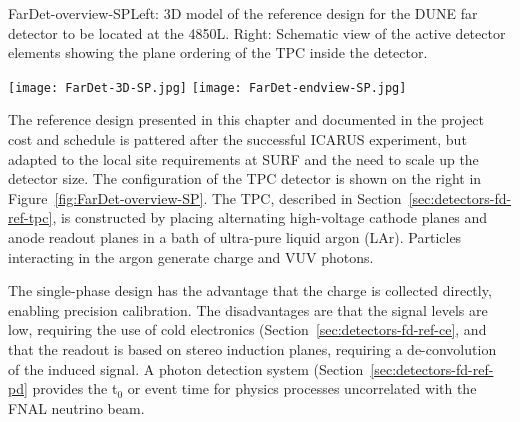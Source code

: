 \begin{cdrfigure}{FarDet-overview-SP}{Left: 3D model of the reference design for the DUNE far detector to be located at the 4850L. Right: Schematic view of the active detector elements showing the plane ordering of the TPC inside the detector.}
\centering
\begin{minipage}[b]{1.0\textwidth}
\begin{center}
\texttt{[image: FarDet-3D-SP.jpg]}
\texttt{[image: FarDet-endview-SP.jpg]}
\end{center}
\end{minipage}
\end{cdrfigure}

The reference design presented in this chapter and documented in the project cost and schedule is %
pattered after the successful ICARUS experiment, but adapted to the local site requirements at SURF and the need to scale up the detector size. The configuration of the TPC detector is shown on the right in Figure~\ref{fig:FarDet-overview-SP}.  The TPC, described in Section~\ref{sec:detectors-fd-ref-tpc}, is constructed by placing alternating high-voltage cathode planes and anode readout planes in a bath of ultra-pure liquid argon (LAr). Particles interacting in the argon generate charge and VUV photons. 

The single-phase design has the advantage that the charge is collected directly, enabling precision calibration. The disadvantages are that the signal levels are low, requiring the use of cold electronics (Section~\ref{sec:detectors-fd-ref-ce}, and that the readout is based on stereo induction planes, requiring a de-convolution of the induced signal. A photon detection system (Section~\ref{sec:detectors-fd-ref-pd} provides the t$_0$ or event time for physics processes uncorrelated with the FNAL neutrino beam.

